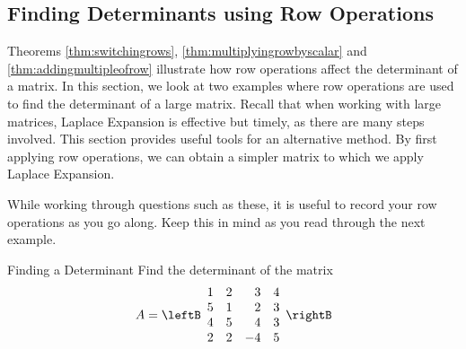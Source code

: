 \subsection{Finding Determinants using Row Operations}

Theorems \ref{thm:switchingrows}, \ref{thm:multiplyingrowbyscalar} and \ref{thm:addingmultipleofrow} illustrate 
how row operations affect the determinant of a matrix. In this section, we look at two examples where row operations are 
used to find the determinant of a large matrix. Recall that when working with large matrices, Laplace Expansion
is effective but timely, as there are many steps involved. This section provides useful tools for
an alternative method. By first applying row operations, we can obtain a simpler matrix to which we apply Laplace Expansion. 

While working through questions such as these, it is useful to record your row operations as you go along. Keep this in mind
as you read through the next example. 

\begin{example}{Finding a Determinant}\label{exa:findingdeterminant}
Find the determinant of the matrix
\begin{equation*}
A=\leftB
\begin{array}{rrrr}
1 & 2 & 3 & 4 \\
5 & 1 & 2 & 3 \\
4 & 5 & 4 & 3 \\
2 & 2 & -4 & 5
\end{array}
\rightB
\end{equation*}
\end{example}

